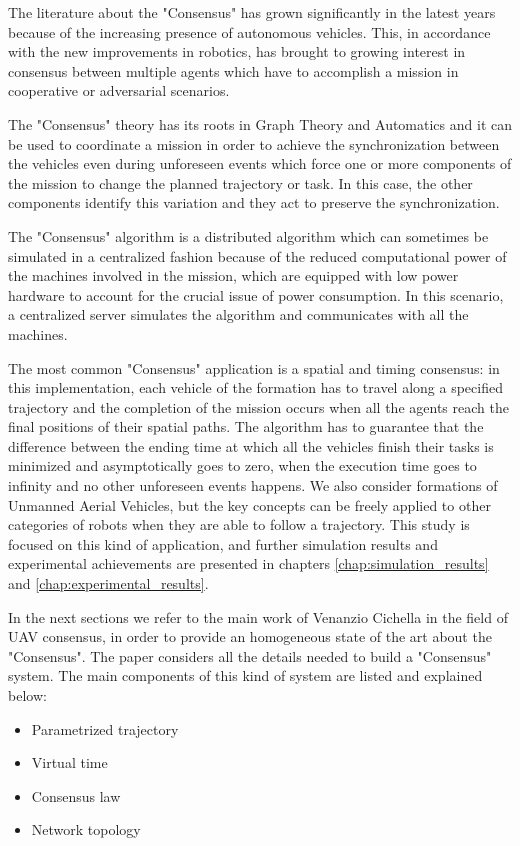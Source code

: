 The literature about the "Consensus" has grown significantly in the latest years
because of the increasing presence of autonomous vehicles. This, in accordance with
the new improvements in robotics, has brought to growing interest in consensus
between multiple agents which have to accomplish a mission in cooperative or adversarial
scenarios.

The "Consensus" theory has its roots in Graph Theory and Automatics and it can
be used to coordinate a mission in order to achieve the synchronization between
the vehicles even during unforeseen events which force one or more
components of the mission to change the planned trajectory or task. In this case,
the other components identify this variation and they act to preserve the
synchronization.

The "Consensus" algorithm is a distributed algorithm which can sometimes be simulated
in a centralized fashion because of the reduced computational power of the machines
involved in the mission, which are equipped with low power hardware to account for
the crucial issue of power consumption.
In this scenario, a centralized server simulates the algorithm and communicates with
all the machines.

The most common "Consensus" application is a spatial and timing consensus: in this
implementation, each vehicle of the formation has to travel along a specified trajectory and the
completion of the mission occurs when all the agents reach the final positions of their
spatial paths. The algorithm has to guarantee that the difference between
the ending time at which all the vehicles finish their tasks is minimized and
asymptotically goes to zero, when the execution time goes to infinity and no other
unforeseen events happens.
We also consider formations of Unmanned Aerial Vehicles, but the key concepts can
be freely applied to other categories of robots when they are able to follow a trajectory.
This study is focused on this kind of application, and further
simulation results and experimental achievements are presented in chapters
\ref{chap:simulation_results} and \ref{chap:experimental_results}.

In the next sections we refer to the main work of Venanzio Cichella \cite{cichellaMain}
in the field of UAV consensus, in order to provide an homogeneous state of the art
about the "Consensus".
The paper considers all the details needed to build a "Consensus" system.
The main components of this kind of system are listed and explained below:
\begin{itemize}
  \item Parametrized trajectory
  \item Virtual time
  \item Consensus law
  \item Network topology
\end{itemize}












